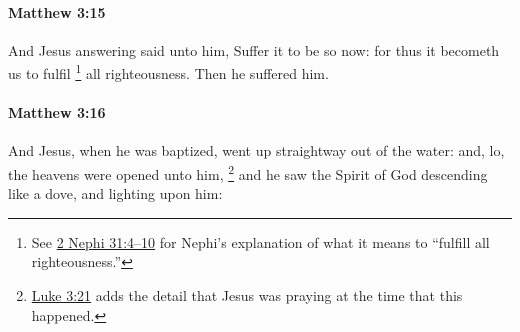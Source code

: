		\paragraph{Matthew 3:15} %
			\label{MATTHEW-3-15}

			And Jesus answering said unto him, Suffer it to be so now: for thus it becometh us to fulfil%
				\footnote{%
					See \hyperref[2NEPHI-31-4]{2 Nephi 31:4--10} for Nephi's explanation of what it means to ``fulfill all righteousness.''
					} 
			all righteousness. Then he suffered him.

			\begin{framed}
			\scriptsize
				\begin{compactdesc}
					\item[SBLG]  \hyperref[PLEROO]{}  \hyperref[DIKAIOSUNE]{}
				\end{compactdesc}
			\end{framed}

		\paragraph{Matthew 3:16} %
			\label{MATTHEW-3-16}

			And Jesus, when he was baptized, went up straightway out of the water: and, lo, the heavens were opened unto him,%
				\footnote{%
					\hyperref[LUKE-3-21]{Luke 3:21} adds the detail that Jesus was praying at the time that this happened.
					}
			and he saw the Spirit of God descending like a dove, and lighting upon him:

